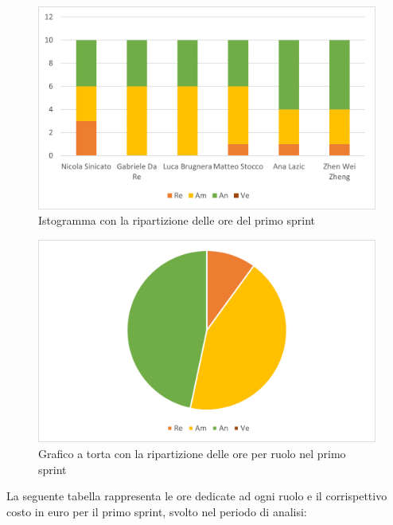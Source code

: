 \begin{figure}[H]
    \centering
    \includegraphics[scale=0.6]{img/grafi preventivo/istogrammi/analisi/periodo1.png}
    \caption{Istogramma con la ripartizione delle ore del primo sprint}
\end{figure}
\begin{figure}[H]
    \centering
    \includegraphics[scale=0.6]{img/grafi preventivo/torta/analisi/periodo1.png}
    \caption{Grafico a torta con la ripartizione delle ore per ruolo nel primo sprint}
\end{figure}

La seguente tabella rappresenta le ore dedicate ad ogni ruolo e il corrispettivo costo in euro per il primo sprint, svolto nel periodo di analisi:

